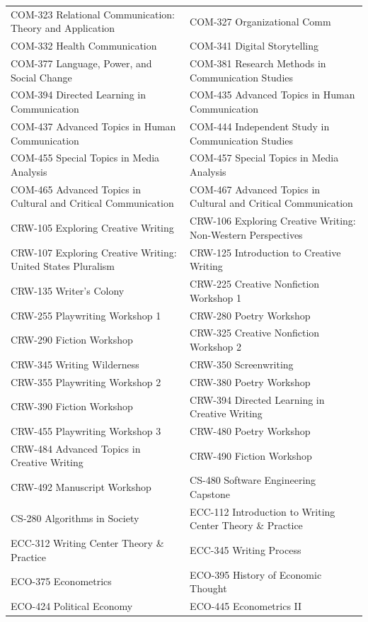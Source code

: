 \documentclass[
  letterpaper,
]{scrbook}
\begin{document}
{\begin{longtable}[]{@{}
  >{\raggedright\arraybackslash}p{}
  >{\raggedright\arraybackslash}p{}@{}}
COM-323 Relational Communication: Theory and Application & COM-327
Organizational Comm \\
COM-332 Health Communication & COM-341 Digital Storytelling \\
COM-377 Language, Power, and Social Change & COM-381 Research Methods in
Communication Studies \\
COM-394 Directed Learning in Communication & COM-435 Advanced Topics in
Human Communication \\
COM-437 Advanced Topics in Human Communication & COM-444 Independent
Study in Communication Studies \\
COM-455 Special Topics in Media Analysis & COM-457 Special Topics in
Media Analysis \\
COM-465 Advanced Topics in Cultural and Critical Communication & COM-467
Advanced Topics in Cultural and Critical Communication \\
CRW-105 Exploring Creative Writing & CRW-106 Exploring Creative Writing:
Non-Western Perspectives \\
CRW-107 Exploring Creative Writing: United States Pluralism & CRW-125
Introduction to Creative Writing \\
CRW-135 Writer's Colony & CRW-225 Creative Nonfiction Workshop 1 \\
CRW-255 Playwriting Workshop 1 & CRW-280 Poetry Workshop \\
CRW-290 Fiction Workshop & CRW-325 Creative Nonfiction Workshop 2 \\
CRW-345 Writing Wilderness & CRW-350 Screenwriting \\
CRW-355 Playwriting Workshop 2 & CRW-380 Poetry Workshop \\
CRW-390 Fiction Workshop & CRW-394 Directed Learning in Creative
Writing \\
CRW-455 Playwriting Workshop 3 & CRW-480 Poetry Workshop \\
CRW-484 Advanced Topics in Creative Writing & CRW-490 Fiction
Workshop \\
CRW-492 Manuscript Workshop & CS-480 Software Engineering Capstone \\
CS-280 Algorithms in Society & ECC-112 Introduction to Writing Center
Theory \& Practice \\
ECC-312 Writing Center Theory \& Practice & ECC-345 Writing Process \\
ECO-375 Econometrics & ECO-395 History of Economic Thought \\
ECO-424 Political Economy & ECO-445 Econometrics II \\

\end{longtable}}
\end{document}
